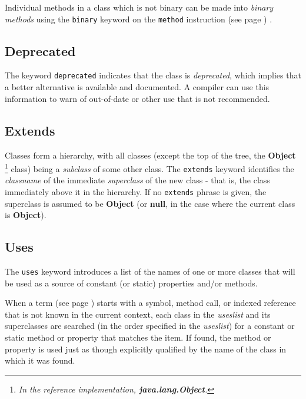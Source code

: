 Individual methods in a class which is not binary can be made into
\emph{binary methods} using the \texttt{binary} keyword on the
 \texttt{method} instruction (see page \pageref{refmethod}) .
\subsection{Deprecated}\label{refdepcla}
 
The keyword \texttt{deprecated} indicates that the class
is \emph{deprecated}, which implies that a better alternative is
available and documented.  A compiler can use this information to warn
of out-of-date or other use that is not recommended.
\subsection{Extends}
 
Classes form a hierarchy, with all classes (except the top of the tree,
the \textbf{Object}
\footnote{
\emph{In the reference implementation, \textbf{java.lang.Object}.}
}
class) being a \emph{subclass} of some other class.
The \texttt{extends} keyword identifies the \emph{classname} of the
immediate \emph{superclass} of the new class - that is, the
class immediately above it in the hierarchy.
If no \texttt{extends} phrase is given, the superclass is assumed to
be \textbf{Object} (or \textbf{null}, in the case where the current
class is \textbf{Object}).
\subsection{Uses}
 
The \texttt{uses} keyword introduces a list of the names of one or
more classes that will be used as a source of constant (or static)
properties and/or methods.
 
When a  term (see page \pageref{refterms})  starts with a symbol, method call, or
indexed reference that is not known in the current context, each class
in the \emph{useslist} and its superclasses are searched (in the
order specified in the \emph{useslist}) for a constant or static
method or property that matches the item.
If found, the method or property is used just as though explicitly
qualified by the name of the class in which it was found.
 

